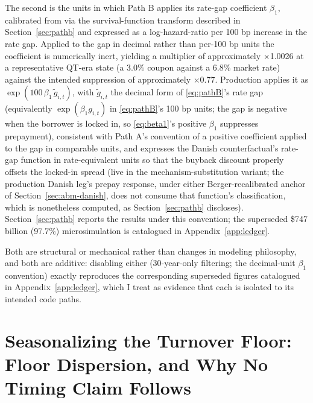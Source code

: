 \documentclass[12pt]{article}
\begin{document}
The second is the units in which Path B applies its rate-gap coefficient $\beta_1$, calibrated from \citet{liebersohn2024} via the survival-function transform described in Section~\ref{sec:pathb} and expressed as a log-hazard-ratio per 100 bp increase in the rate gap. Applied to the gap in decimal rather than per-100 bp units the coefficient is numerically inert, yielding a multiplier of approximately $\times$1.0026 at a representative QT-era state (a 3.0\% coupon against a 6.8\% market rate) against the intended suppression of approximately $\times$0.77. Production applies it as $\exp(100\,\beta_1\,\tilde g_{i,t})$, with $\tilde g_{i,t}$ the decimal form of \eqref{eq:pathB}'s rate gap (equivalently $\exp(\beta_1 g_{i,t})$ in \eqref{eq:pathB}'s 100 bp units; the gap is negative when the borrower is locked in, so \eqref{eq:beta1}'s positive $\beta_1$ suppresses prepayment), consistent with Path A's convention of a positive coefficient applied to the gap in comparable units, and expresses the Danish counterfactual's rate-gap function in rate-equivalent units so that the buyback discount properly offsets the locked-in spread (live in the mechanism-substitution variant; the production Danish leg's prepay response, under either Berger-recalibrated anchor of Section~\ref{sec:abm-danish}, does not consume that function's classification, which is nonetheless computed, as Section~\ref{sec:pathb} discloses). Section~\ref{sec:pathb} reports the results under this convention; the superseded \$747 billion (97.7\%) microsimulation is catalogued in Appendix~\ref{app:ledger}.

Both are structural or mechanical rather than changes in modeling philosophy, and both are additive: disabling either (30-year-only filtering; the decimal-unit $\beta_1$ convention) exactly reproduces the corresponding superseded figures catalogued in Appendix~\ref{app:ledger}, which I treat as evidence that each is isolated to its intended code paths.

\section{Seasonalizing the Turnover Floor: Floor Dispersion, and Why No Timing Claim Follows}\label{sec:robustness-seasonalfloor}
\end{document}
